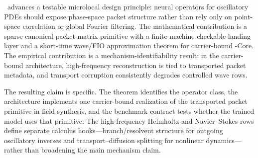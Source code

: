 \MiNO\ advances a testable microlocal design principle: neural operators for oscillatory PDEs should expose phase-space packet structure rather than rely only on point-space correlation or global Fourier filtering.  The mathematical contribution is a sparse canonical packet-matrix primitive with a finite machine-checkable landing layer and a short-time wave/FIO approximation theorem for carrier-bound \MiNO-Core.  The empirical contribution is a mechanism-identifiability result: in the carrier-bound architecture, high-frequency reconstruction is tied to transported packet metadata, and transport corruption consistently degrades controlled wave rows.

The resulting claim is specific.  The theorem identifies the operator class, the architecture implements one carrier-bound realization of the transported packet primitive in field synthesis, and the benchmark contract tests whether the trained model uses that primitive.  The high-frequency Helmholtz and Navier--Stokes rows define separate calculus hooks---branch/resolvent structure for outgoing oscillatory inverses and transport--diffusion splitting for nonlinear dynamics---rather than broadening the main mechanism claim.
